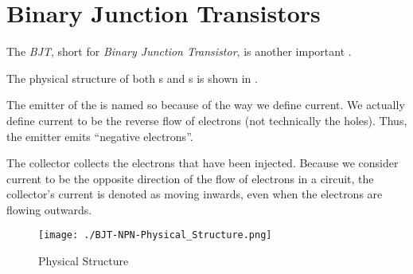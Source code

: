 \section{Binary Junction Transistors}\label{sec:BJTs}
\begin{definition}[BJT]\label{def:BJT}
  The \emph{BJT}, short for \emph{Binary Junction Transistor}, is another important .

  The physical structure of both \NPNTransistor{}s and \PNPTransistor{}s is shown in .

  \begin{remark}
    The emitter of the  is named so because of the way we define current.
    We actually define current to be the reverse flow of electrons (not technically the holes).
    Thus, the emitter emits ``negative electrons''.

    The collector collects the electrons that have been injected.
    Because we consider current to be the opposite direction of the flow of electrons in a circuit, the collector's current is denoted as moving inwards, even when the electrons are flowing outwards.
  \end{remark}
\end{definition}

\begin{figure}[h!tbp]
  \centering
  \texttt{[image: ./BJT-NPN-Physical\_Structure.png]}
  \caption{\NPNTransistor{} Physical Structure \parencite[p.~307]{sedraTextbook7}}
  \label{fig:BJT-NPN-Physical_Structure}
\end{figure}


